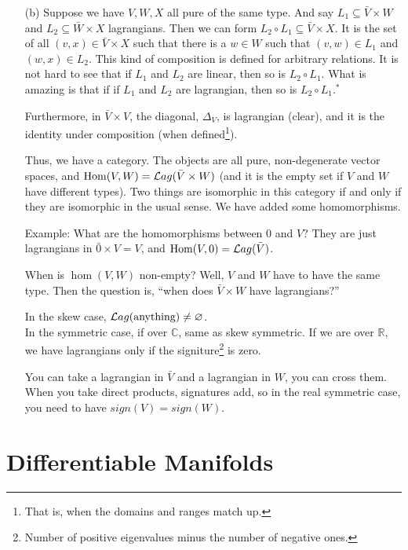 \begin{itemize}
 \item[(b)]  Suppose we have $V,W,X$ all pure of the same type.
 And say $L_1\subseteq \bar V\times W$ and $L_2\subseteq \bar
 W\times X$ lagrangians.  Then we can form $L_2\circ L_1\subseteq
 \bar V\times X$.  It is the set of all $(v,x)\in \bar V\times X$
 such that there is a $w\in W$ such that $(v,w)\in L_1$ and
 $(w,x)\in L_2$.  This kind of composition is defined for
 arbitrary relations.  It is not hard to see that if $L_1$ and
 $L_2$ are linear, then so is $L_2\circ L_1$.  What is amazing is
 that if if $L_1$ and $L_2$ are lagrangian, then so is $L_2\circ
 L_1$.$^*$

 Furthermore, in $\bar V\times V$, the diagonal, $\Delta_V$, is
 lagrangian (clear), and it is the identity under composition
 (when defined\footnote{That is, when the domains and ranges match
 up.}).

 Thus, we have a category.  The objects are all pure,
 non-degenerate vector spaces, and $\text{\rm Hom}(V,W) = \mathcal{L}ag(\bar V\times
 W)$ (and it is the empty set if $V$ and $W$ have different
 types).  Two things are isomorphic in this category if and only
 if they are isomorphic in the usual sense.  We have added some
 homomorphisms.

 Example: What are the homomorphisms between $0$ and $V$?  They
 are just lagrangians in $\bar 0 \times V = V$, and
 $\text{\rm Hom}(V,0)=\mathcal{L}ag(\bar V)$.

 When is $\hom(V,W)$ non-empty?  Well, $V$ and $W$ have to have
 the same type.  Then the question is, ``when does $\bar V\times
 W$ have lagrangians?''
 \begin{lemma}
   In the skew case, $\mathcal{L}ag(\text{anything})\not= \varnothing$.\\
   In the symmetric case, if over $\mathbb{C}$, same as skew
   symmetric.  If we are over $\mathbb{R}$, we have lagrangians
   only if the signiture\footnote{Number of positive eigenvalues
   minus the number of negative ones.} is zero.
 \end{lemma}
 You can take a lagrangian in $\bar V$ and a lagrangian in $W$,
 you can cross them.  When you take direct products, signatures
 add, so in the real symmetric case, you need to have
 $sign(V)=sign(W)$.
 \end{itemize}

 \section*{Differentiable Manifolds}

